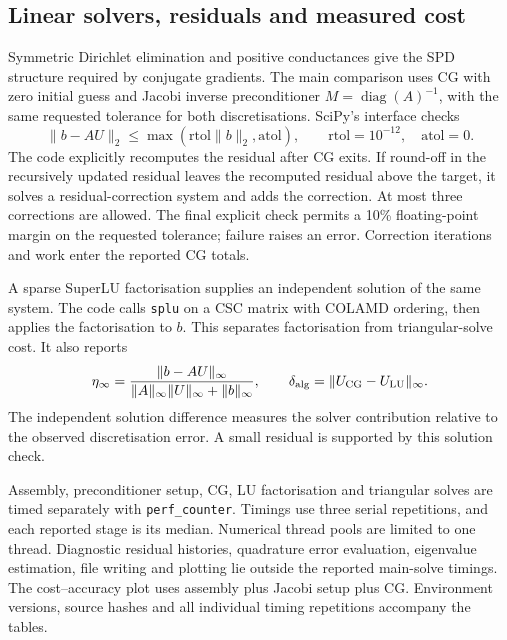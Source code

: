 \subsection{Linear solvers, residuals and measured cost}
Symmetric Dirichlet elimination and positive conductances give the SPD structure required by conjugate gradients. The main comparison uses CG with zero initial guess and Jacobi inverse preconditioner $M=\operatorname{diag}(A)^{-1}$, with the same requested tolerance for both discretisations. SciPy's interface checks
\[
\|b-AU\|_2\leq\max(\mathrm{rtol}\|b\|_2,\mathrm{atol}),
\qquad \mathrm{rtol}=10^{-12},\quad\mathrm{atol}=0.
\]
The code explicitly recomputes the residual after CG exits. If round-off in the recursively updated residual leaves the recomputed residual above the target, it solves a residual-correction system and adds the correction. At most three corrections are allowed. The final explicit check permits a 10\% floating-point margin on the requested tolerance; failure raises an error. Correction iterations and work enter the reported CG totals.

A sparse SuperLU factorisation supplies an independent solution of the same system. The code calls \texttt{splu} on a CSC matrix with COLAMD ordering, then applies the factorisation to $b$. This separates factorisation from triangular-solve cost. It also reports
\[
\eta_\infty=
\frac{\|b-AU\|_\infty}{\|A\|_\infty\|U\|_\infty+\|b\|_\infty},
\qquad
\delta_{\rm alg}=\|U_{\rm CG}-U_{\rm LU}\|_\infty.
\]
The independent solution difference measures the solver contribution relative to the observed discretisation error. A small residual is supported by this solution check.

Assembly, preconditioner setup, CG, LU factorisation and triangular solves are timed separately with \texttt{perf\_counter}. Timings use three serial repetitions, and each reported stage is its median. Numerical thread pools are limited to one thread. Diagnostic residual histories, quadrature error evaluation, eigenvalue estimation, file writing and plotting lie outside the reported main-solve timings. The cost--accuracy plot uses assembly plus Jacobi setup plus CG. Environment versions, source hashes and all individual timing repetitions accompany the tables.

